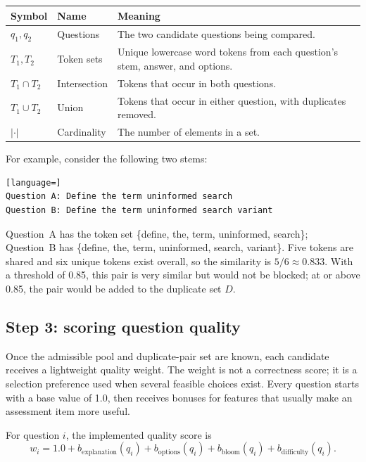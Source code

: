 \documentclass[11pt,a4paper]{article}
\begin{document}
\begin{center}
\begin{tabular}{@{}llp{7.7cm}@{}}
\toprule
\textbf{Symbol} & \textbf{Name} & \textbf{Meaning} \\
\midrule
$q_1,q_2$ & Questions & The two candidate questions being compared. \\
$T_1,T_2$ & Token sets & Unique lowercase word tokens from each question's stem, answer, and options. \\
$T_1\cap T_2$ & Intersection & Tokens that occur in both questions. \\
$T_1\cup T_2$ & Union & Tokens that occur in either question, with duplicates removed. \\
$|\cdot|$ & Cardinality & The number of elements in a set. \\
\bottomrule
\end{tabular}
\end{center}

For example, consider the following two stems:
\begin{lstlisting}[language=]
Question A: Define the term uninformed search
Question B: Define the term uninformed search variant
\end{lstlisting}
Question~A has the token set \{define, the, term, uninformed, search\};
Question~B has \{define, the, term, uninformed, search, variant\}. Five tokens
are shared and six unique tokens exist overall, so the similarity is
$5/6 \approx 0.833$. With a threshold of 0.85, this pair is very similar but
would not be blocked; at or above 0.85, the pair would be added to the duplicate
set $D$.

\subsection{Step 3: scoring question quality}

Once the admissible pool and duplicate-pair set are known, each candidate
receives a lightweight quality weight. The weight is not a correctness score;
it is a selection preference used when several feasible choices exist. Every
question starts with a base value of 1.0, then receives bonuses for features
that usually make an assessment item more useful.

For question $i$, the implemented quality score is
\begin{equation}
  w_i = 1.0
      + b_{\mathrm{explanation}}(q_i)
      + b_{\mathrm{options}}(q_i)
      + b_{\mathrm{bloom}}(q_i)
      + b_{\mathrm{difficulty}}(q_i).
\end{equation}
\end{document}
